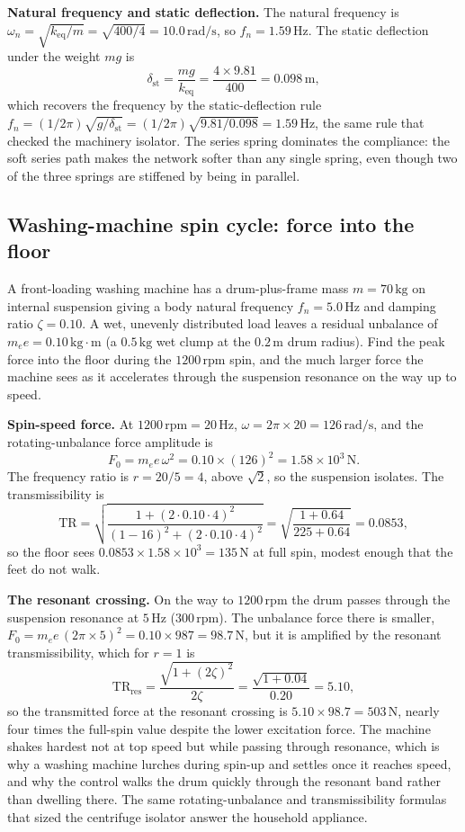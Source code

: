 \textbf{Natural frequency and static deflection.} The natural frequency
is $\omega_n = \sqrt{k_{\text{eq}}/m} = \sqrt{400/4} = 10.0\,\si{\radian
\per\second}$, so $f_n = 1.59\,\si{\hertz}$. The static deflection under
the weight $mg$ is
\[
\delta_{\text{st}} = \frac{mg}{k_{\text{eq}}} = \frac{4\times 9.81}{400}
= 0.098\,\si{\meter},
\]
which recovers the frequency by the static-deflection rule $f_n =
(1/2\pi)\sqrt{g/\delta_{\text{st}}} = (1/2\pi)\sqrt{9.81/0.098} =
1.59\,\si{\hertz}$, the same rule that checked the machinery isolator.
The series spring dominates the compliance: the soft series path makes
the network softer than any single spring, even though two of the three
springs are stiffened by being in parallel.

\subsection{Washing-machine spin cycle: force into the floor}

A front-loading washing machine has a drum-plus-frame mass $m = 70\,\si{
\kilogram}$ on internal suspension giving a body natural frequency
$f_n = 5.0\,\si{\hertz}$ and damping ratio $\zeta = 0.10$. A wet,
unevenly distributed load leaves a residual unbalance of $m_e e =
0.10\,\si{\kilogram}\cdot\si{\meter}$ (a $0.5\,\si{\kilogram}$ wet
clump at the $0.2\,\si{\meter}$ drum radius). Find the peak force into
the floor during the $1200\,\text{rpm}$ spin, and the much larger force
the machine sees as it accelerates through the suspension resonance on
the way up to speed.

\textbf{Spin-speed force.} At $1200\,\text{rpm} = 20\,\si{\hertz}$,
$\omega = 2\pi\times 20 = 126\,\si{\radian\per\second}$, and the
rotating-unbalance force amplitude is
\[
F_0 = m_e e\,\omega^2 = 0.10\times (126)^2 = 1.58\times 10^3\,\text{N}.
\]
The frequency ratio is $r = 20/5 = 4$, above $\sqrt2$, so the suspension
isolates. The transmissibility is
\[
\mathrm{TR} = \sqrt{\frac{1 + (2\cdot 0.10\cdot 4)^2}{(1 - 16)^2 +
(2\cdot 0.10\cdot 4)^2}} = \sqrt{\frac{1 + 0.64}{225 + 0.64}} =
0.0853,
\]
so the floor sees $0.0853\times 1.58\times 10^3 = 135\,\text{N}$ at full
spin, modest enough that the feet do not walk.

\textbf{The resonant crossing.} On the way to $1200\,\text{rpm}$ the
drum passes through the suspension resonance at $5\,\si{\hertz}$
($300\,\text{rpm}$). The unbalance force there is smaller, $F_0 = m_e
e\,(2\pi\times 5)^2 = 0.10\times 987 = 98.7\,\text{N}$, but it is
amplified by the resonant transmissibility, which for $r = 1$ is
\[
\mathrm{TR}_{\text{res}} = \frac{\sqrt{1 + (2\zeta)^2}}{2\zeta} =
\frac{\sqrt{1 + 0.04}}{0.20} = 5.10,
\]
so the transmitted force at the resonant crossing is $5.10\times 98.7 =
503\,\text{N}$, nearly four times the full-spin value despite the lower
excitation force. The machine shakes hardest not at top speed but while
passing through resonance, which is why a washing machine lurches during
spin-up and settles once it reaches speed, and why the control walks the
drum quickly through the resonant band rather than dwelling there. The
same rotating-unbalance and transmissibility formulas that sized the
centrifuge isolator answer the household appliance.


